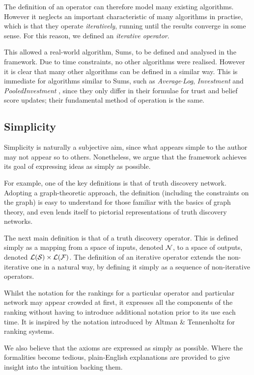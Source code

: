 \documentclass[../../main.tex]{subfiles}
\begin{document}
The definition of an operator can therefore model many existing algorithms.
However it neglects an important characteristic of many algorithms in practise,
which is that they operate \emph{iteratively}, running until the results
converge in some sense. For this reason, we defined an \emph{iterative
operator}.

This allowed a real-world algorithm, Sums, to be defined and analysed in the
framework. Due to time constraints, no other algorithms were realised. However
it is clear that many other algorithms can be defined in a similar way. This
is immediate for algorithms similar to Sums, such as \emph{Average$\cdot$Log},
\emph{Investment} and \emph{PooledInvestment} \cite{pasternack}, since they
only differ in their formulae for trust and belief score updates; their
fundamental method of operation is the same.

\subsection*{Simplicity}

Simplicity is naturally a subjective aim, since what appears simple to the
author may not appear so to others. Nonetheless, we argue that the framework
achieves its goal of expressing ideas as simply as possible.

For example, one of the key definitions is that of truth discovery network.
Adopting a graph-theoretic approach, the definition (including the constraints
on the graph) is easy to understand for those familiar with the basics of graph
theory, and even lends itself to pictorial representations of truth discovery
networks.

The next main definition is that of a truth discovery operator. This is defined
simply as a mapping from a space of inputs, denoted $\mathcal{N}$, to a space of
outputs, denoted $\mathcal{L}(\mathcal{S}) \times \mathcal{L}(\mathcal{F})$. The definition of an
iterative operator extends the non-iterative one in a natural way, by defining
it simply as a sequence of non-iterative operators.

Whilst the notation for the rankings for a particular operator and particular
network may appear crowded at first, it expresses all the components of the
ranking without having to introduce additional notation prior to its use each
time. It is inspired by the notation introduced by Altman \& Tennenholtz
\cite{altman_foundations} for ranking systems.

We also believe that the axioms are expressed as simply as possible. Where the
formalities become tedious, plain-English explanations are provided to give
insight into the intuition backing them.
\end{document}
